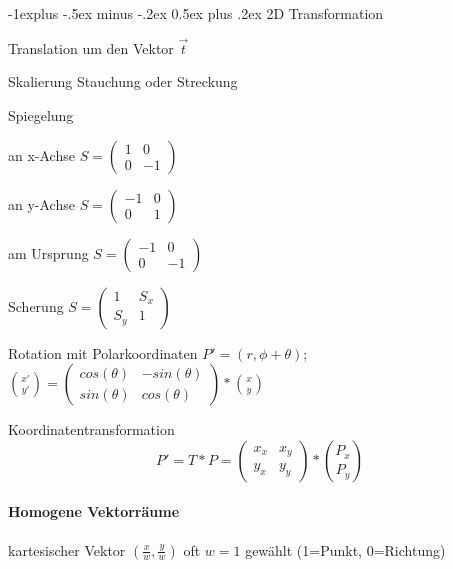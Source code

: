 \documentclass[landscape]{article}
\makeatletter
\renewcommand{\subsection}{\@startsection{subsection}{2}{0mm}%
                                {-1explus -.5ex minus -.2ex}%
                                {0.5ex plus .2ex}%
                                {\normalfont\normalsize\bfseries}}
\makeatother
\begin{document}
\begin{multicols}{3}
  \subsection{2D Transformation}
  \begin{description*}
    \item[Translation] um den Vektor $\vec{t}$
    \item[Skalierung] Stauchung oder Streckung
    \item[Spiegelung]
    \begin{itemize*}
      \item an x-Achse $S=\begin{pmatrix} 1 & 0 \\ 0 & -1 \end{pmatrix}$
      \item an y-Achse $S=\begin{pmatrix} -1 & 0 \\ 0 & 1 \end{pmatrix}$
      \item am Ursprung $S=\begin{pmatrix} -1 & 0 \\ 0 & -1 \end{pmatrix}$
    \end{itemize*}
    \item[Scherung] $S=\begin{pmatrix} 1 & S_x \\ S_y & 1 \end{pmatrix}$
    \item[Rotation mit Polarkoordinaten] $P'=(r,\phi+\theta)$; $\binom{x'}{y'}=\begin{pmatrix} cos(\theta) & -sin(\theta) \\ sin(\theta) & cos(\theta)\end{pmatrix}*\binom{x}{y}$
    \item[Koordinatentransformation] $$P' =T*P = \begin{pmatrix} x_x & x_y\\ y_x & y_y \end{pmatrix} * \binom{P_x}{P_y}$$
  \end{description*}
  
  \paragraph{Homogene Vektorräume}
  kartesischer Vektor $(\frac{x}{w},\frac{y}{w})$ oft $w=1$ gewählt (1=Punkt, 0=Richtung)
  

\end{multicols}
\end{document}
